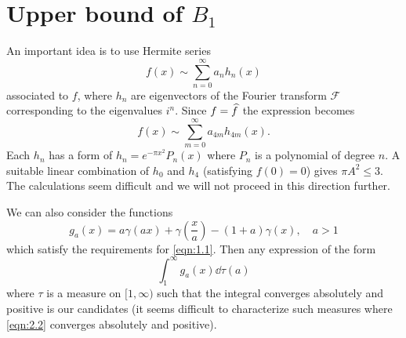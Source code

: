 \section{Upper bound of $B_{1}$}

An important idea is to use Hermite series
\[
    f(x) \sim \sum_{n = 0}^{\infty}a_n h_n(x)
\]
associated to $f$, where $h_n$ are eigenvectors of the Fourier transform $\mathcal{F}$ corresponding to the eigenvalues $i^n$.
Since $f = \widehat{f}$ the expression becomes
\[
    f(x) \sim \sum_{m=0}^{\infty} a_{4m} h_{4m}(x).
\]
Each $h_{n}$ has a form of $h_{n} = e^{-\pi x^2} P_{n}(x)$ where $P_{n}$ is a polynomial of degree $n$.
A suitable linear combination of $h_{0}$ and $h_{4}$ (satisfying $f(0) = 0$) gives $\pi A^{2} \leq 3$.
The calculations seem difficult and we will not proceed in this direction further.

We can also consider the functions
\begin{equation}
    \label{eqn:2.1}
    g_{a}(x) = a \gamma(ax) + \gamma\left(\frac{x}{a}\right) - (1 + a) \gamma(x),\quad  a > 1
\end{equation}
which satisfy the requirements for \eqref{eqn:1.1}.
Then any expression of the form
\begin{equation}
    \label{eqn:2.2}
    \int_{1}^{\infty} g_{a}(x) \dd \tau(a)
\end{equation}
where $\tau$ is a measure on $[1, \infty)$ such that the integral converges absolutely and positive is our candidates (it seems difficult to characterize such measures where \eqref{eqn:2.2} converges absolutely and positive).

